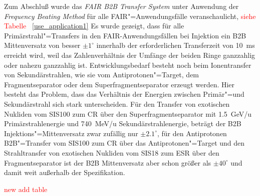 Zum Abschlu\ss{} wurde das \textit{FAIR B2B Transfer System} unter Anwendung der \textit{Frequency Beating Method} f\"ur alle FAIR"=Anwendungsf\"alle veranschaulicht, \textcolor{red}{siehe Tabelle ~\ref{use_application1}} Es wurde gezeigt, dass f\"ur alle Prim\"arstrahl"=Transfers in den FAIR-Anwendungsf\"allen bei Injektion ein B2B Mittenversatz von besser $\pm1^\circ$ innerhalb der erforderlichen Transferzeit von \SI{10}{\ms} erreicht wird, weil das Zahlenverh\"altnis der Umf\"ange der beiden Ringe ganzzahlig oder nahezu ganzzahlig ist.  Entwicklungsbedarf besteht noch beim Ionentransfer von Sekund\"arstrahlen, wie sie vom Antiprotonen"=Target, dem Fragmentseparator oder dem Superfragmentseparator erzeugt werden. Hier besteht das Problem, dass das Verh\"altnis der Energien zwischen Prim\"ar"=und Sekund\"arstrahl sich stark unterscheiden. F\"ur den Transfer von exotischen Nukliden vom SIS100 zum CR \"uber den Superfragmentseparator mit \SI{1.5}{GeV/u} Prim\"arstrahlenergie und \SI{740}{MeV/u} Sekund\"arstrahlenergie, betr\"agt der B2B Injektions"=Mittenversatz zwar zufällig nur $\pm2.1^\circ$, f\"ur den Antiprotonen B2B"=Transfer vom SIS100 zum CR \"uber das Antiprotonen"=Target und den Strahltransfer von exotischen Nukliden vom SIS18 zum ESR \"uber den Fragmentseparator ist der B2B Mittenversatz aber schon gr\"o\ss{}er als $\pm40^\circ$ und damit weit au\ss{}erhalb der Spezifikation.

\textcolor{red}{new add table}

